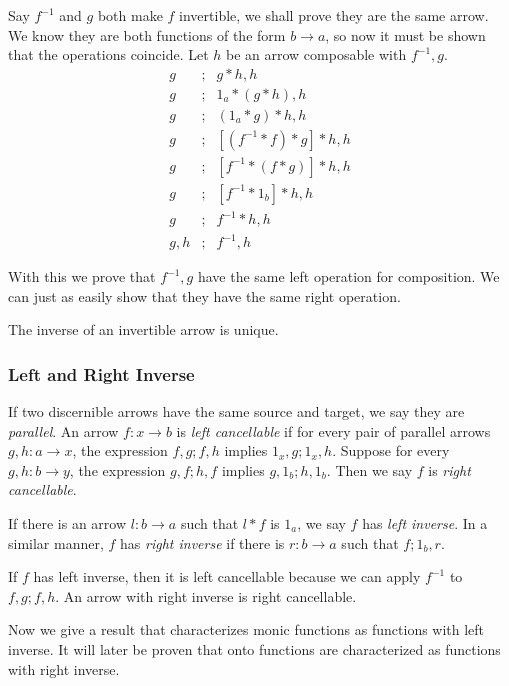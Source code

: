 \documentclass [12pt]{book}
\begin{document}
Say $f^{-1}$ and $g$ both make $f$ invertible, we shall prove they are the same arrow. We know they are both functions of the form $b\rightarrow a$, so now it must be shown that the operations coincide. Let $h$ be an arrow composable with $f^{-1},g$.
\begin{eqnarray}\nonumber g&;&g*h,h\\\nonumber g&;&1_a*(g*h),h\\\nonumber g&;&(1_a*g)*h,h\\\nonumber g&;&[(f^{-1}*f)*g]*h,h\\\nonumber g&;&[f^{-1}*(f*g)]*h,h\\\nonumber g&;&[f^{-1}*1_b]*h,h\\\nonumber g&;&f^{-1}*h,h\\\nonumber g,h&;&f^{-1},h\end{eqnarray}

With this we prove that $f^{-1},g$ have the same left operation for composition. We can just as easily show that they have the same right operation. 
\begin{proposition}The inverse of an invertible arrow is unique.\end{proposition}

\subsubsection{Left and Right Inverse}If two discernible arrows have the same source and target, we say they are \textit{parallel}. An arrow $f:x\rightarrow b$ is \textit{left cancellable} if for every pair of parallel arrows $g,h:a\rightarrow x$, the expression $f,g;f,h$ implies $1_x,g;1_x,h$. Suppose for every $g,h:b\rightarrow y$, the expression $g,f;h,f$ implies $g,1_b;h,1_b$. Then we say $f$ is \textit{right cancellable}.

If there is an arrow $l:b\rightarrow a$ such that $l*f$ is $1_a$, we say $f$ has \textit{left inverse}. In a similar manner, $f$ has \textit{right inverse} if there is $r:b\rightarrow a$ such that $f;1_b,r$.

\begin{proposition}If $f$ has left inverse, then it is left cancellable because we can apply $f^{-1}$ to $f,g;f,h$. An arrow with right inverse is right cancellable.
\end{proposition}

Now we give a result that characterizes monic functions as functions with left inverse. It will later be proven that onto functions are characterized as functions with right inverse.
\end{document}
